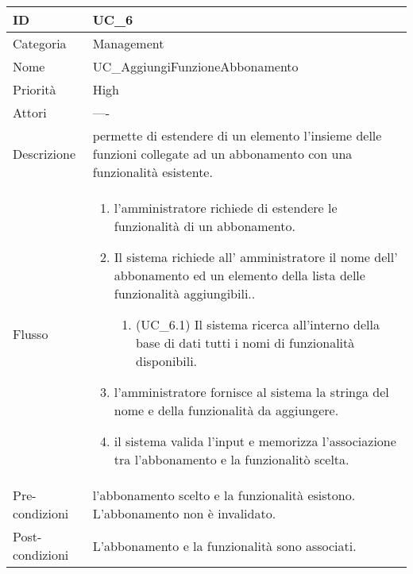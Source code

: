 \begin{center}
\begin{tabular}{ |p{2cm}|p{13cm}|  }
\hline
ID & UC\_6 \\\hline
Categoria & Management\\\hline
Nome & UC\_AggiungiFunzioneAbbonamento\\\hline
Priorità & High \\\hline
Attori &  ---- \\\hline
Descrizione & permette di estendere di un elemento l'insieme delle funzioni collegate ad un abbonamento con una funzionalità esistente.\\\hline
Flusso &  	\begin{enumerate}
			\item l'amministratore richiede di estendere le funzionalità di  un abbonamento.
			\item Il sistema richiede all' amministratore il nome dell' abbonamento ed un elemento della lista delle funzionalità aggiungibili..
			\begin{enumerate}
				\item (UC\_6.1) Il sistema ricerca all'interno della base di dati tutti i nomi di funzionalità disponibili.
			\end{enumerate}
			\item l'amministratore fornisce al sistema la stringa del nome e della funzionalità da aggiungere.
			\item il sistema valida l'input e memorizza l'associazione tra l'abbonamento e la funzionalitò scelta.
		\end{enumerate}\\\hline
Pre-condizioni &  l'abbonamento scelto e la funzionalità esistono.\newline 
			L'abbonamento non è invalidato.\\\hline
Post-condizioni &  L'abbonamento e la funzionalità sono associati.\\\hline
\end{tabular}
\label{table_use_case:6}\newline


\end{center}

